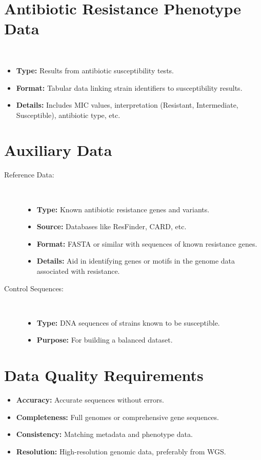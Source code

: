 \documentclass[12pt]{article}
\begin{document}
\section*{Antibiotic Resistance Phenotype Data}
\begin{description}[leftmargin=1cm]
    \item[Resistance Profile:] \
    \begin{itemize}
        \item \textbf{Type:} Results from antibiotic susceptibility tests.
        \item \textbf{Format:} Tabular data linking strain identifiers to susceptibility results.
        \item \textbf{Details:} Includes MIC values, interpretation (Resistant, Intermediate, Susceptible), antibiotic type, etc.
    \end{itemize}
\end{description}

\section{Auxiliary Data}
\begin{description}
    \item[Reference Data:] \
    \begin{itemize}
        \item \textbf{Type:} Known antibiotic resistance genes and variants.
        \item \textbf{Source:} Databases like ResFinder, CARD, etc.
        \item \textbf{Format:} FASTA or similar with sequences of known resistance genes.
        \item \textbf{Details:} Aid in identifying genes or motifs in the genome data associated with resistance.
    \end{itemize} 
    \item[Control Sequences:]\
    \begin{itemize}
        \item \textbf{Type:} DNA sequences of strains known to be susceptible.
        \item \textbf{Purpose:} For building a balanced dataset.
    \end{itemize}
\end{description}

\section{Data Quality Requirements}
\begin{itemize}
    \item \textbf{Accuracy:} Accurate sequences without errors.
    \item \textbf{Completeness:} Full genomes or comprehensive gene sequences.
    \item \textbf{Consistency:} Matching metadata and phenotype data.
    \item \textbf{Resolution:} High-resolution genomic data, preferably from WGS.
\end{itemize}
\end{document}
